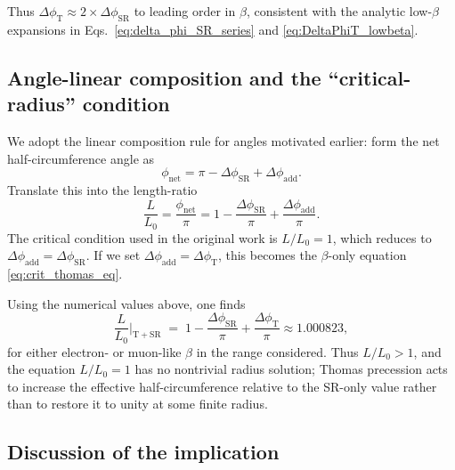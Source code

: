 \documentclass[%
 reprint,
 amsmath,amssymb,
 aps,
]{revtex4-1}
\numberwithin{equation}{section}
\begin{document}
Thus $\Delta\phi_{\mathrm{T}}\approx 2\times\Delta\phi_{\mathrm{SR}}$ to leading order in $\beta$, consistent with the analytic low-$\beta$ expansions in Eqs.~\eqref{eq:delta_phi_SR_series} and \eqref{eq:DeltaPhiT_lowbeta}.

\subsection{Angle-linear composition and the ``critical-radius'' condition}

We adopt the linear composition rule for angles motivated earlier: form the net half-circumference angle as
\begin{equation}
\phi_{\mathrm{net}}=\pi - \Delta\phi_{\mathrm{SR}} + \Delta\phi_{\mathrm{add}}.
\label{eq:phi_net}
\end{equation}
Translate this into the length-ratio
\begin{equation}
\frac{L}{L_0}=\frac{\phi_{\mathrm{net}}}{\pi}=1-\frac{\Delta\phi_{\mathrm{SR}}}{\pi}+\frac{\Delta\phi_{\mathrm{add}}}{\pi}.
\label{eq:L_over_L0}
\end{equation}
The critical condition used in the original work is $L/L_0=1$, which reduces to $\Delta\phi_{\mathrm{add}}=\Delta\phi_{\mathrm{SR}}$. If we set $\Delta\phi_{\mathrm{add}}=\Delta\phi_{\mathrm{T}}$, this becomes the $\beta$-only equation \eqref{eq:crit_thomas_eq}.

Using the numerical values above, one finds
\begin{equation}
\frac{L}{L_0}\Big|_{\mathrm{T+SR}} \;=\; 1 - \frac{\Delta\phi_{\mathrm{SR}}}{\pi} + \frac{\Delta\phi_{\mathrm{T}}}{\pi}
\approx 1.000823,
\label{eq:L_over_L0_num}
\end{equation}
for either electron- or muon-like $\beta$ in the range considered. Thus $L/L_0>1$, and the equation $L/L_0=1$ has no nontrivial radius solution; Thomas precession acts to increase the effective half-circumference relative to the SR-only value rather than to restore it to unity at some finite radius.

\subsection{Discussion of the implication}
\end{document}
